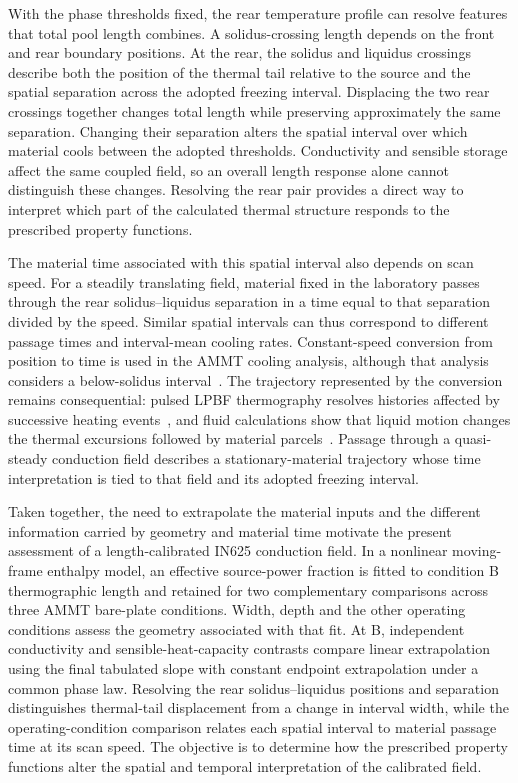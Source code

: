 With the phase thresholds fixed, the rear temperature profile can resolve features that total pool length combines. A solidus-crossing length depends on the front and rear boundary positions. At the rear, the solidus and liquidus crossings describe both the position of the thermal tail relative to the source and the spatial separation across the adopted freezing interval. Displacing the two rear crossings together changes total length while preserving approximately the same separation. Changing their separation alters the spatial interval over which material cools between the adopted thresholds. Conductivity and sensible storage affect the same coupled field, so an overall length response alone cannot distinguish these changes. Resolving the rear pair provides a direct way to interpret which part of the calculated thermal structure responds to the prescribed property functions.

The material time associated with this spatial interval also depends on scan speed. For a steadily translating field, material fixed in the laboratory passes through the rear solidus--liquidus separation in a time equal to that separation divided by the speed. Similar spatial intervals can thus correspond to different passage times and interval-mean cooling rates. Constant-speed conversion from position to time is used in the AMMT cooling analysis, although that analysis considers a below-solidus interval~\cite{lane2020}. The trajectory represented by the conversion remains consequential: pulsed LPBF thermography resolves histories affected by successive heating events~\cite{hooper2018}, and fluid calculations show that liquid motion changes the thermal excursions followed by material parcels~\cite{Hou2024Dissolution}. Passage through a quasi-steady conduction field describes a stationary-material trajectory whose time interpretation is tied to that field and its adopted freezing interval.

Taken together, the need to extrapolate the material inputs and the different information carried by geometry and material time motivate the present assessment of a length-calibrated IN625 conduction field. In a nonlinear moving-frame enthalpy model, an effective source-power fraction is fitted to condition B thermographic length and retained for two complementary comparisons across three AMMT bare-plate conditions. Width, depth and the other operating conditions assess the geometry associated with that fit. At B, independent conductivity and sensible-heat-capacity contrasts compare linear extrapolation using the final tabulated slope with constant endpoint extrapolation under a common phase law. Resolving the rear solidus--liquidus positions and separation distinguishes thermal-tail displacement from a change in interval width, while the operating-condition comparison relates each spatial interval to material passage time at its scan speed. The objective is to determine how the prescribed property functions alter the spatial and temporal interpretation of the calibrated field.
